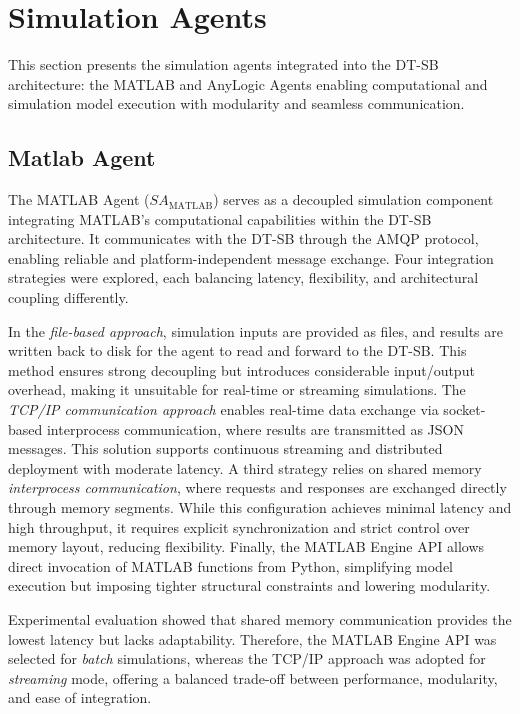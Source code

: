 
\section{Simulation Agents}
\label{sec:sim-agents}

This section presents the simulation agents integrated into the DT-SB architecture: the MATLAB and AnyLogic Agents enabling computational and simulation model execution with modularity and seamless communication.

\subsection{Matlab Agent}

The MATLAB Agent ($SA_{\text{MATLAB}}$) serves as a decoupled simulation component integrating MATLAB’s computational capabilities within the DT-SB architecture. It communicates with the DT-SB through the AMQP protocol, enabling reliable and platform-independent message exchange. Four integration strategies were explored, each balancing latency, flexibility, and architectural coupling differently. 

In the \textit{file-based approach}, simulation inputs are provided as files, and results are written back to disk for the agent to read and forward to the DT-SB. This method ensures strong decoupling but introduces considerable input/output overhead, making it unsuitable for real-time or streaming simulations. The \textit{TCP/IP communication approach} enables real-time data exchange via socket-based interprocess communication, where results are transmitted as JSON messages. This solution supports continuous streaming and distributed deployment with moderate latency. A third strategy relies on shared memory \textit{interprocess communication}, where requests and responses are exchanged directly through memory segments. While this configuration achieves minimal latency and high throughput, it requires explicit synchronization and strict control over memory layout, reducing flexibility. Finally, the MATLAB Engine API allows direct invocation of MATLAB functions from Python, simplifying model execution but imposing tighter structural constraints and lowering modularity.

Experimental evaluation showed that shared memory communication provides the lowest latency but lacks adaptability. Therefore, the MATLAB Engine API was selected for \emph{batch} simulations, whereas the TCP/IP approach was adopted for \emph{streaming} mode, offering a balanced trade-off between performance, modularity, and ease of integration.

